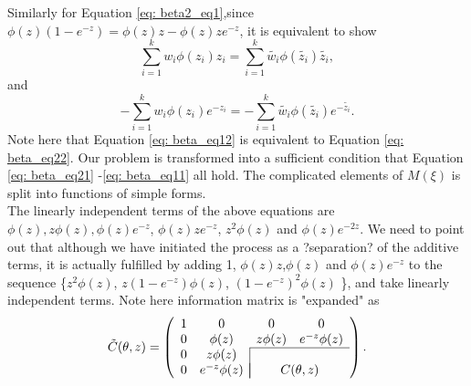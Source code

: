 \documentclass[11pt]{amsart}
\theoremstyle{definition}
\theoremstyle{remark}
\begin{document}
Similarly for Equation \eqref{eq: beta2_eq1},since  $\phi(z)(1-e^{-z}) = \phi(z)z-\phi(z)ze^{-z}$, it is equivalent to show 
\begin{equation}\label{eq: beta_eq11}
\sum_{i=1}^{k} w_i \phi(z_i)z_i = \sum_{i=1}^{k} \tilde{w_i}  \phi(\tilde{z_i})\tilde{z_i},\end{equation} 
and  
\begin{equation}\label{eq: beta_eq12}
-\sum_{i=1}^{k} w_i  \phi(z_i)e^{-z_i} = -\sum_{i=1}^{k} \tilde{w_i} \phi(\tilde{z_i}) e^{-\tilde{z_i}}.\end{equation} 
Note here that Equation \eqref{eq: beta_eq12} is equivalent to Equation  \eqref{eq: beta_eq22}.  Our problem is transformed into a sufficient condition that Equation \eqref{eq: beta_eq21} -\eqref{eq: beta_eq11} all hold. The complicated elements of $M(\xi)$ is split into functions of simple forms. \\

The linearly independent terms of the above equations are $\phi(z), z\phi(z), \phi(z)e^{-z}$, $\phi(z)ze^{-z}$, $z^2\phi(z)$ and $ \phi(z)e^{-2z}$. We need to point out that although we have initiated the process as a ?separation? of the additive terms, it is actually fulfilled by adding 1, $\phi(z)z$,$\phi(z)$ and  $\phi(z)e^{-z}$ to the sequence \{$z^2\phi(z)$, $z(1-e^{-z})\phi(z)$, $(1-e^{-z})^2\phi(z)$ \},  and take linearly independent terms. Note here information matrix is "expanded" as
\begin{equation}
   \tilde{C}(\theta,z) = \left ( \begin{array}{cc|cc}
1& \multicolumn{1}{c}{0}&  0&  0\\
0&\multicolumn{1}{c}{\phi(z)}&z\phi(z)&  e^{-z}\phi(z)\\\cline{3-4}
0&z\phi(z) & & \\
0&e^{-z}\phi(z) &\multicolumn{2}{|c}{C(\theta,z)}
\end{array}\right).
\end{equation}
\end{document}
